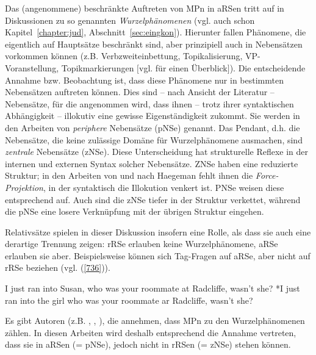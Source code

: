 Das (angenommene) beschränkte Auftreten von MPn in aRSen tritt auf in Diskussionen zu so genannten \textit{Wurzelphänomenen}  (vgl. auch schon Kapitel~\ref{chapter:jud}, Abschnitt~\ref{sec:eingkon}). Hierunter fallen Phänomene, die eigentlich auf Hauptsätze be\-schränkt sind, aber prinzipiell auch in Nebensätzen vorkommen können (z.B. Verbzweiteinbettung, Topikalisierung, VP-Voranstellung, Topikmarkierungen $[$vgl. \citealt{Heycock2005} für einen Überblick$]$). Die entscheidende Annahme bzw. Beobachtung ist, dass diese Phänomene nur in bestimmten Nebensätzen auftreten können. Dies sind – nach Ansicht der Literatur – Nebensätze, für die angenommen wird, dass ihnen – trotz ihrer syntaktischen Abhängigkeit – illokutiv eine gewisse Eigenständigkeit zukommt. Sie werden in den Arbeiten von \citet{Haegeman2002, Haegeman2004, Haegeman2006} \textit{periphere} Nebensätze  (pNSe) genannt. Das \glq Pendant\grq {}, d.h. die Nebensätze, die keine zulässige Domäne für Wurzelphänomene ausmachen, sind \textit{zentrale} Nebensätze (zNSe). Diese Unterscheidung hat strukturelle Reflexe in der internen und externen Syntax solcher Nebensätze. ZNSe haben eine reduzierte Struktur; in den Arbeiten von und nach Haegeman fehlt ihnen die  \textit{Force-Projektion}, in der syntaktisch die Illokution venkert ist. PNSe weisen diese entspre\-chend auf. Auch sind die zNSe tiefer in der Struktur verkettet, während die pNSe eine losere Verknüpfung mit der übrigen Struktur eingehen.

Relativsätze spielen in dieser Diskussion insofern eine Rolle, als dass sie auch eine derartige Trennung zeigen: rRSe erlauben keine Wurzelphänomene, aRSe erlauben sie aber. Beispielsweise können sich Tag-Fragen  auf aRSe, aber nicht auf rRSe beziehen (vgl. (\ref{736})).

\begin{exe}
	\ex\label{736} 
		\begin{xlist}	
			\ex\label{736a} I just ran into Susan, who was your roommate at Radcliffe, wasn’t she?
			\ex\label{736b} *I just ran into the girl who was your roommate ar Radcliffe, wasn’t she?
			\hfill\hbox{\citet[490]{Hooper1973}}
		\end{xlist}
\end{exe}
Es gibt Autoren (z.B. \citealt{Coniglio2011}, \citealt{Frey2011, Frey2012}, \citealt{Abraham2012}), die annehmen, dass MPn zu den Wurzelphänomenen zählen. In diesen Arbeiten wird deshalb entsprechend die Annahme vertreten, dass sie in aRSen (= pNSe), jedoch nicht in rRSen (= zNSe) stehen können.

